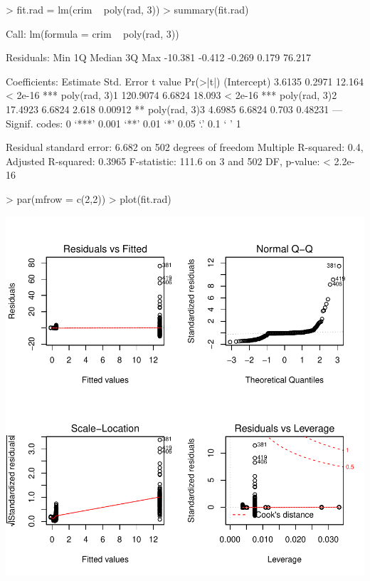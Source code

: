 \documentclass[a4paper]{article}
\begin{document}
\begin{Schunk}
\begin{Sinput}
> fit.rad = lm(crim ~ poly(rad, 3))
> summary(fit.rad)
\end{Sinput}
\begin{Soutput}
Call:
lm(formula = crim ~ poly(rad, 3))

Residuals:
    Min      1Q  Median      3Q     Max 
-10.381  -0.412  -0.269   0.179  76.217 

Coefficients:
              Estimate Std. Error t value Pr(>|t|)    
(Intercept)     3.6135     0.2971  12.164  < 2e-16 ***
poly(rad, 3)1 120.9074     6.6824  18.093  < 2e-16 ***
poly(rad, 3)2  17.4923     6.6824   2.618  0.00912 ** 
poly(rad, 3)3   4.6985     6.6824   0.703  0.48231    
---
Signif. codes:  0 ‘***’ 0.001 ‘**’ 0.01 ‘*’ 0.05 ‘.’ 0.1 ‘ ’ 1

Residual standard error: 6.682 on 502 degrees of freedom
Multiple R-squared:    0.4,	Adjusted R-squared:  0.3965 
F-statistic: 111.6 on 3 and 502 DF,  p-value: < 2.2e-16
\end{Soutput}
\begin{Sinput}
> par(mfrow = c(2,2))
> plot(fit.rad)
\end{Sinput}
\end{Schunk}
\includegraphics{mutivariblelm-rad2}
\end{document}
